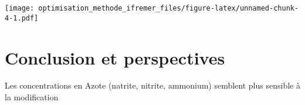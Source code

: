 \documentclass[]{article}
\begin{document}
\texttt{[image: optimisation\_methode\_ifremer\_files/figure-latex/unnamed-chunk-4-1.pdf]}

\section{Conclusion et perspectives}\label{conclusion-et-perspectives}

Les concentrations en Azote (natrite, nitrite, ammonium) semblent plus
sensible à la modification
\end{document}
